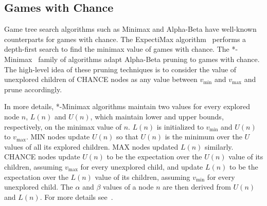 \documentclass[runningheads]{llncs}
\newcommand{\pess}{\mathit{L}}
\newcommand{\opti}{\mathit{U}}
\newcommand{\vmax}{v_{\text{max}}}
\newcommand{\vmin}{v_{\text{min}}}
\begin{document}
\subsection{Games with Chance}
Game tree search algorithms such as Minimax and Alpha-Beta have well-known counterparts for games with chance.
The ExpectiMax algorithm~\cite{michie1966game} performs a depth-first search to find the minimax value of games with chance.
The *-Minimax~\cite{ballard1983minimax} family of algorithms adapt Alpha-Beta pruning to games with chance. The high-level idea of these pruning techniques is to consider the value of unexplored children of CHANCE nodes as any value between $\vmin$ and $\vmax$ and prune accordingly. 

In more details, *-Minimax algorithms maintain two values for every explored node $n$, $\pess(n)$ and $\opti(n)$, which maintain lower and upper bounds, respectively, on the minimax value of $n$. 
$\pess(n)$ is initialized to $\vmin$ and $\opti(n)$ to $\vmax$. 
MIN nodes update $\opti(n)$ so that $\opti(n)$ is the minimum over the $\opti$ values of all its explored children. MAX nodes updated $\pess(n)$ similarly. CHANCE nodes update $\opti(n)$ to be the expectation over the $\opti(n)$ value of its children, assuming $\vmax{}$ for every unexplored child, and update $\pess(n)$ to be the expectation over the $\pess(n)$ value of its children, assuming $\vmin{}$ for every unexplored child. 
The $\alpha$ and $\beta$ values of a node $n$ are then derived from $\opti(n)$ and $\pess(n)$. For more details see~\cite{hauk2004rediscovering}. 

\end{document}
